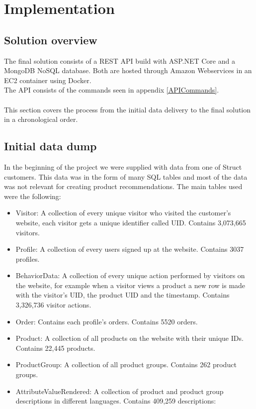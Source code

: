 
\chapter{Implementation} %

\label{Chapter5} %


\section{Solution overview}

The final solution consists of a \gls{REST} API build with ASP.NET Core and a MongoDB \gls{NoSQL} database. Both are hosted through Amazon Webservices in an EC2 container using Docker. \\
The API consists of the commands seen in appendix \ref{APICommands}. \\\\

This section covers the process from the initial data delivery to the final solution in a chronological order.

\section{Initial data dump}
In the beginning of the project we were supplied with data from one of \gls{Struct} customers. This data was in the form of many SQL tables and most of the data was not relevant for creating product recommendations. The main tables used were the following:  \\
\begin{itemize}
\item Visitor: A collection of every unique visitor who visited the customer's website, each visitor gets a unique identifier called UID. Contains 3,073,665  visitors.
\item Profile: A collection of every users signed up at the website. Contains 3037 profiles.
\item BehaviorData: A collection of every unique action performed by visitors on the website, for example when a visitor views a product a new row is made with the visitor's UID, the product UID and the timestamp. Contains 3,326,736 visitor actions.
\item Order: Contains each profile's orders. Contains 5520 orders.
\item Product: A collection of all products on the website with their unique IDs. Contains 22,445 products.
\item ProductGroup: A collection of all product groups. Contains 262 product groups.
\item AttributeValueRendered: A collection of product and product group descriptions in different languages. Contains 409,259 descriptions:

\end{itemize}

